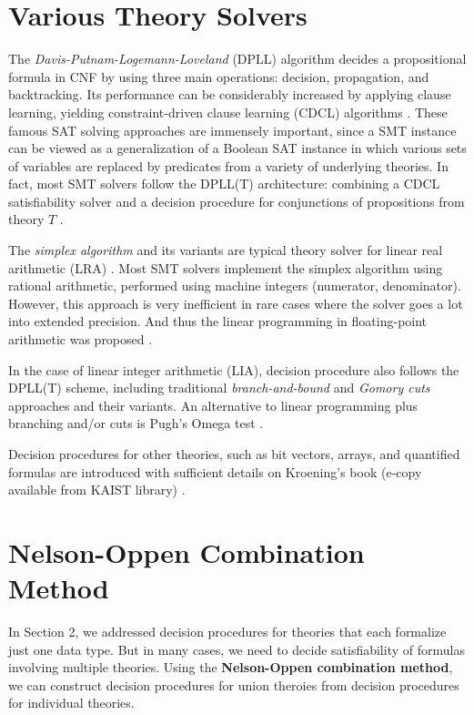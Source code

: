 \documentclass[10pt,a4paper]{article}
\begin{document}
	\section{Various Theory Solvers}
	
	The \textit{Davis-Putnam-Logemann-Loveland} (DPLL) algorithm decides a propositional formula in CNF by using three main operations: decision, propagation, and backtracking. Its performance can be considerably increased by applying clause learning, yielding constraint-driven clause learning (CDCL) algorithms \cite{CDCL}. These famous SAT solving approaches are immensely important, since a SMT instance can be viewed as a generalization of a Boolean SAT instance in which various sets of variables are replaced by predicates from a variety of underlying theories. In fact, most SMT solvers follow the DPLL(T) architecture: combining a CDCL satisfiability solver and a decision procedure for conjunctions of propositions from theory $ T $ \cite{survey}.
	
	The \textit{simplex algorithm} and its variants are typical theory solver for linear real arithmetic (LRA) \cite{Dantzig}. Most SMT solvers implement the simplex algorithm using rational arithmetic, performed using machine integers (numerator, denominator). However, this approach is very inefficient in rare cases where the solver goes a lot into extended precision. And thus the linear programming in floating-point arithmetic was proposed \cite{floating-point}. 
	
	In the case of linear integer arithmetic (LIA), decision procedure also follows the DPLL(T) scheme, including traditional \textit{branch-and-bound} and \textit{Gomory cuts} approaches \cite{linear} and their variants. An alternative to linear programming plus branching and/or cuts is Pugh's Omega test \cite{Pugh}.
	
	Decision procedures for other theories, such as bit vectors, arrays, and quantified formulas are introduced with sufficient details on Kroening's book (e-copy available from KAIST library) \cite{Kroening}.
	
	\section {Nelson-Oppen Combination Method}
	
	In Section 2, we addressed decision procedures for theories that each formalize just one data type. But in many cases, we need to decide satisfiability of formulas involving multiple theories. Using the \textbf{Nelson-Oppen combination method}, we can construct decision procedures for union theroies from decision procedures for individual theories.
	
\end{document}
